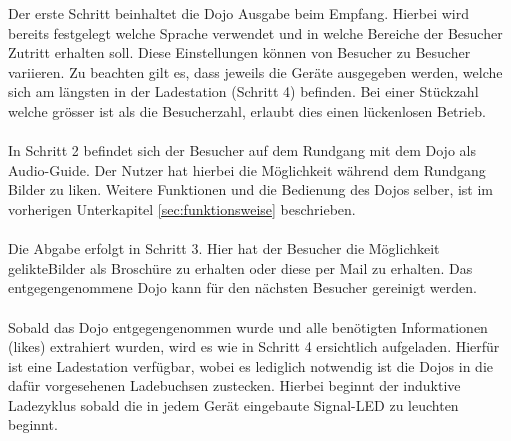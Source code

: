 Der erste Schritt beinhaltet die Dojo Ausgabe beim Empfang. Hierbei wird bereits festgelegt welche Sprache verwendet und in welche Bereiche der Besucher Zutritt erhalten soll. Diese Einstellungen können von Besucher zu Besucher variieren. Zu beachten gilt es, dass jeweils die Geräte ausgegeben werden, welche sich am längsten in der Ladestation (Schritt 4) befinden. Bei einer Stückzahl welche grösser ist als die Besucherzahl, erlaubt dies einen lückenlosen Betrieb.
\\
\\
In Schritt 2 befindet sich der Besucher auf dem Rundgang mit dem Dojo als Audio-Guide. Der Nutzer hat hierbei die Möglichkeit während dem Rundgang Bilder zu \glqq liken\grqq . Weitere Funktionen und die Bedienung des Dojos selber, ist im vorherigen Unterkapitel \ref{sec:funktionsweise} beschrieben.
\\
\\
Die Abgabe erfolgt in Schritt 3. Hier hat der Besucher die Möglichkeit \glqq gelikte\grqq Bilder als Broschüre zu erhalten oder diese per Mail zu erhalten. Das entgegengenommene Dojo kann für den nächsten Besucher gereinigt werden.
\\
\\
Sobald das Dojo entgegengenommen wurde und alle benötigten Informationen (\glqq likes\grqq) extrahiert wurden, wird es wie in Schritt 4 ersichtlich aufgeladen. Hierfür ist eine Ladestation verfügbar, wobei es lediglich notwendig ist die Dojos in die dafür vorgesehenen Ladebuchsen zustecken. Hierbei beginnt der induktive Ladezyklus sobald die in jedem Gerät eingebaute Signal-LED zu leuchten beginnt.
